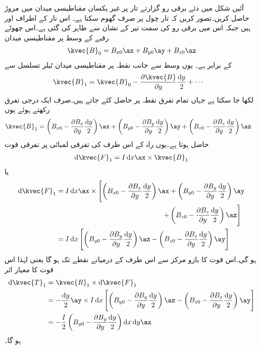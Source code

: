 آئیں شکل  میں دئے  برقی رو گزارتے تار پر غیر یکساں مقناطیسی میدان  میں مروڑ حاصل کریں۔تصور کریں کہ تار چول  پر صرف گھوم سکتا ہے۔ اس تار کے اطراف  اور  ہیں جبکہ اس میں برقی رو  کی سمت تیر کے نشان سے ظاہر کی گئی ہے۔اس چھوٹے رقبے کے وسط  پر مقناطیسی میدان
\begin{align}
\kvec{B}_0=B_{x0}\ax+B_{y0}\ay+B_{z0}\az
\end{align}
کے برابر ہے۔ یوں وسط سے  جانب نقطہ  پر مقناطیسی میدان ٹیلر تسلسل سے
\begin{align*}
\kvec{B}_1&=\kvec{B}_0 -\frac{\partial \kvec{B}}{\partial y}\frac{\dif y}{2}+\cdots
\end{align*}
لکھا جا سکتا ہے جہاں تمام تفرق نقطہ  پر حاصل کئے جاتے ہیں۔صرف ایک درجی تفرق رکھتے ہوئے یوں
\begin{align*}
\kvec{B}_1&=\left(B_{x0}-\frac{\partial B_{x}}{\partial y} \frac{\dif y}{2}\right)\ax+\left(B_{y0}-\frac{\partial B_{y}}{\partial y} \frac{\dif y}{2}\right)\ay+\left(B_{z0}-\frac{\partial B_{z}}{\partial y} \frac{\dif y}{2}\right)\az
\end{align*}
حاصل ہوتا ہے۔یوں راہ کے اس طرف کی  تفرقی لمبائی پر تفرقی قوت
\begin{align*}
\dif \kvec{F}_1=I \dif x \ax \times \kvec{B}_1
\end{align*}
یا
\begin{align*}
\dif \kvec{F}_1&=I \dif x \ax \times \left[\left(B_{x0}-\frac{\partial B_{x}}{\partial y} \frac{\dif y}{2}\right)\ax+\left(B_{y0}-\frac{\partial B_{y}}{\partial y} \frac{\dif y}{2}\right)\ay \right. \\
& \quad \quad\quad \quad\quad \quad\quad \quad\quad \quad\quad \quad\quad\quad \quad \left. +\left(B_{z0}-\frac{\partial B_{z}}{\partial y} \frac{\dif y}{2}\right)\az \right]\\
&=I \dif x \left[\left(B_{y0}-\frac{\partial B_{y}}{\partial y} \frac{\dif y}{2}\right)\az-\left(B_{z0}-\frac{\partial B_{z}}{\partial y} \frac{\dif y}{2}\right)\ay \right]
\end{align*}
ہو گی۔اس قوت کا بازو مرکز سے اس طرف کے درمیانے نقطے تک ہو گا یعنی  لہٰذا اس قوت کا معیار اثر
\begin{align*}
\dif \kvec{T}_1&=\kvec{R}_1 \times \dif \kvec{F}_1\\
&=-\frac{\dif y}{2}\ay \times I \dif x \left[\left(B_{y0}-\frac{\partial B_{y}}{\partial y} \frac{\dif y}{2}\right)\az-\left(B_{z0}-\frac{\partial B_{z}}{\partial y} \frac{\dif y}{2}\right)\ay \right]\\
&=- \frac{I}{2}\left(B_{y0}-\frac{\partial B_{y}}{\partial y} \frac{\dif y}{2}\right)\dif x \dif y \ax
\end{align*}
ہو گا۔

